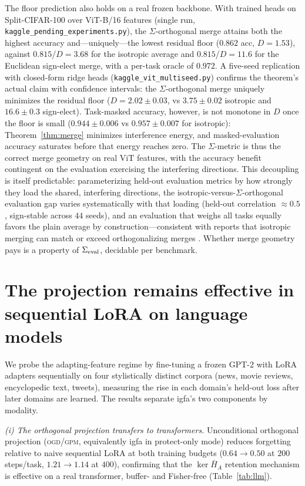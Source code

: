 \documentclass[10pt,a4paper]{article}
\theoremstyle{plain}
\theoremstyle{definition}
\newcommand{\Sig}{\Sigma}
\newcommand{\IGFA}{igfa}
\newcommand{\OGD}{\textsc{ogd}}
\begin{document}
The floor prediction also holds on a real frozen backbone. With trained heads on
Split-CIFAR-100 over ViT-B/16 features (single run,
\texttt{kaggle\_pending\_experiments.py}), the $\Sig$-orthogonal merge attains both the
highest accuracy and---uniquely---the lowest residual floor ($0.862$ acc, $D=1.53$), against
$0.815$/$D=3.68$ for the isotropic average and $0.815$/$D=11.6$ for the Euclidean sign-elect
merge, with a per-task oracle of $0.972$. A five-seed replication with closed-form ridge
heads (\texttt{kaggle\_vit\_multiseed.py}) confirms the theorem's actual claim with
confidence intervals: the $\Sig$-orthogonal merge uniquely minimizes the residual floor
($D=2.02\pm0.03$, vs $3.75\pm0.02$ isotropic and $16.6\pm0.3$ sign-elect). Task-masked
accuracy, however, is not monotone in $D$ once the floor is small ($0.944\pm0.006$ vs
$0.957\pm0.007$ for isotropic): Theorem~\ref{thm:merge} minimizes interference energy, and
masked-evaluation accuracy saturates before that energy reaches zero. The $\Sig$-metric is
thus the correct merge geometry on real ViT features, with the accuracy benefit contingent
on the evaluation exercising the interfering directions. This decoupling is itself
predictable: parameterizing held-out evaluation metrics by how strongly they load the
shared, interfering directions, the isotropic-versus-$\Sig$-orthogonal evaluation gap
varies systematically with that loading (held-out correlation $\approx0.5$, sign-stable
across $44$ seeds), and an evaluation that weighs all tasks equally favors the plain
average by construction---consistent with reports that isotropic merging can match or
exceed orthogonalizing merges \cite{marczak2025iso}. Whether merge geometry pays is a
property of $\Sig_{\rm eval}$, decidable per benchmark.

\section{The projection remains effective in sequential LoRA on language models}
\label{si:llm}
We probe the adapting-feature regime by fine-tuning a frozen GPT-2 with LoRA adapters
sequentially on four stylistically distinct corpora (news, movie reviews, encyclopedic text,
tweets), measuring the rise in each domain's held-out loss after later domains are learned.
The results separate \IGFA{}'s two components by modality.

\emph{(i) The orthogonal projection transfers to transformers.} Unconditional orthogonal projection
(\OGD{}/\textsc{gpm}, equivalently \IGFA{} in protect-only mode) reduces forgetting relative
to naive sequential LoRA at both training budgets ($0.64\!\to\!0.50$ at $200$ steps/task,
$1.21\!\to\!1.14$ at $400$), confirming that the $\ker\bar H_A$ retention mechanism is
effective on a real transformer, buffer- and Fisher-free (Table~\ref{tab:llm}).
\end{document}
